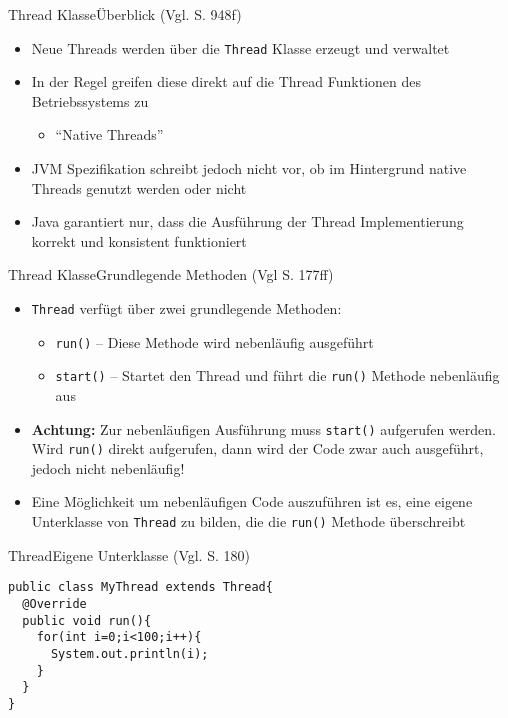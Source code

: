 \begin{frame}{Thread Klasse}{Überblick (Vgl. \cite{ullenboom2018java} S. 948f)}
    \begin{itemize}
        \item Neue Threads werden über die \texttt{Thread} Klasse erzeugt und verwaltet
        \item In der Regel greifen diese direkt auf die Thread Funktionen des Betriebssystems zu
        \begin{itemize}
            \item "`Native Threads"'
        \end{itemize}
        \item JVM Spezifikation schreibt jedoch nicht vor, ob im Hintergrund native Threads genutzt werden oder nicht
        \item Java garantiert nur, dass die Ausführung der Thread Implementierung korrekt und konsistent funktioniert
    \end{itemize}
\end{frame}

\begin{frame}{Thread Klasse}{Grundlegende Methoden (Vgl \cite{ullenboom2014java} S. 177ff)}
    \begin{itemize}
        \item \texttt{Thread} verfügt über zwei grundlegende Methoden:
        \begin{itemize}
            \item \texttt{run()} -- Diese Methode wird nebenläufig ausgeführt
            \item \texttt{start()} -- Startet den Thread und führt die \texttt{run()} Methode nebenläufig aus
        \end{itemize}
        \item \textbf{Achtung:} Zur nebenläufigen Ausführung muss \texttt{start()} aufgerufen werden. Wird \texttt{run()} direkt aufgerufen, dann wird der Code zwar auch ausgeführt, jedoch nicht nebenläufig!
        \item Eine Möglichkeit um nebenläufigen Code auszuführen ist es, eine eigene Unterklasse von \texttt{Thread} zu bilden, die die \texttt{run()} Methode überschreibt
    \end{itemize}
\end{frame}

\begin{frame}[fragile]{Thread}{Eigene Unterklasse (Vgl. \cite{ullenboom2014java} S. 180)}
\lstset{style=java}
\begin{lstlisting}
public class MyThread extends Thread{
  @Override
  public void run(){
    for(int i=0;i<100;i++){
      System.out.println(i);
    }
  }
}
\end{lstlisting}
\end{frame}

